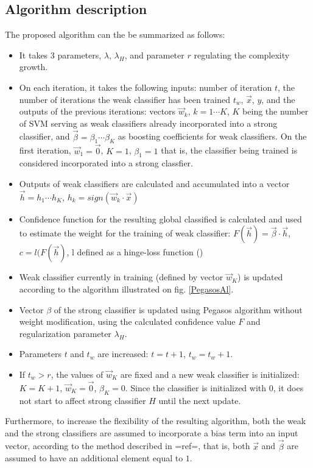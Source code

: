 \subsection {Algorithm description}
The proposed algorithm  can the be summarized as follows: 
\begin{itemize}
\item It takes 3 parameters, $\lambda$, $\lambda_H$, and parameter $r$ regulating the complexity growth.
\item On each iteration, it takes the following inputs: number of iteration $t$, the number of iterations the weak classifier has been trained $t_w$, $\vec{x}$, $y$, and the outputs of the previous iterations: vectors $\vec{w}_k$, $k=1\cdots K$, $K$ being the number of SVM serving as weak classifiers already incorporated into a strong classifier, and $\vec{\beta}=\beta_1 \cdots\beta_K$ as boosting coefficients for weak classifiers.  On the first iteration, $\vec{w}_1=\vec{0}$, $K=1$, $\beta_1=1$ that is, the classifier being trained is considered incorporated into a strong classfier. 
\item Outputs of weak classifiers are calculated and accumulated into a vector $\vec{h}=h_1\cdots h_K$, $h_k=sign(\vec{w}_k\cdot \vec{x})$ 
\item Confidence function for the resulting global classified is calculated and used to estimate the weight for the training of weak classifier: $F(\vec{h})=\vec{\beta}\cdot \vec{h}$, $c=l(F(\vec{h})$, l defined as a hinge-loss function ()
\item Weak classifier currently in training (defined by vector $\vec{w}_K$) is updated according to the algorithm illustrated on fig. \ref{PegasosAl}.
\item Vector $\beta$ of the strong classifier is updated using Pegasos algorithm without weight modification, using the calculated confidence value $F$ and regularization parameter $\lambda_H$.
\item Parameters $t$ and $t_w$ are increased: $t=t+1$, $t_w=t_w+1$. 
\item If $t_w>r$, the values of $\vec{w}_K$ are fixed and a new weak classifier is initialized: $K=K+1$, $\vec{w}_K=\vec{0}$,  $\beta_K=0$. Since the classifier is initialized with $0$, it does not start to affect strong classifier $H$ until the next update.
\end{itemize}
Furthermore, to increase the flexibility of the resulting algorithm, both the weak and the strong classifiers are assumed to incorporate a bias term into an input vector, according to the method described in {{=ref=}}, that is, both $\vec{x}$ and $\vec{\beta}$ are assumed to have an additional element equal to $1$. 

